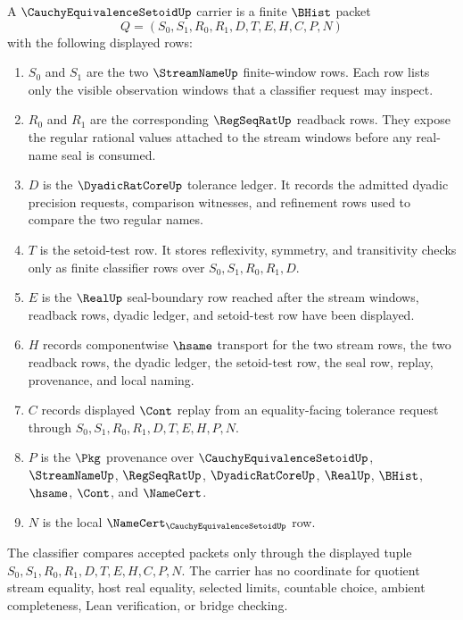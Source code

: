 \begin{definition}
\label{def:cauchy-equivalence-setoid-carrier}
A $\CauchyEquivalenceSetoidUp$ carrier is a finite $\BHist$ packet
$$
Q=(S_0,S_1,R_0,R_1,D,T,E,H,C,P,N)
$$
with the following displayed rows:
\begin{enumerate}
\item $S_0$ and $S_1$ are the two $\StreamNameUp$ finite-window rows. Each row lists only the visible observation windows that a classifier request may inspect.
\item $R_0$ and $R_1$ are the corresponding $\RegSeqRatUp$ readback rows. They expose the regular rational values attached to the stream windows before any real-name seal is consumed.
\item $D$ is the $\DyadicRatCoreUp$ tolerance ledger. It records the admitted dyadic precision requests, comparison witnesses, and refinement rows used to compare the two regular names.
\item $T$ is the setoid-test row. It stores reflexivity, symmetry, and transitivity checks only as finite classifier rows over $S_0,S_1,R_0,R_1,D$.
\item $E$ is the $\RealUp$ seal-boundary row reached after the stream windows, readback rows, dyadic ledger, and setoid-test row have been displayed.
\item $H$ records componentwise $\hsame$ transport for the two stream rows, the two readback rows, the dyadic ledger, the setoid-test row, the seal row, replay, provenance, and local naming.
\item $C$ records displayed $\Cont$ replay from an equality-facing tolerance request through $S_0,S_1,R_0,R_1,D,T,E,H,P,N$.
\item $P$ is the $\Pkg$ provenance over $\CauchyEquivalenceSetoidUp$, $\StreamNameUp$, $\RegSeqRatUp$, $\DyadicRatCoreUp$, $\RealUp$, $\BHist$, $\hsame$, $\Cont$, and $\NameCert$.
\item $N$ is the local $\NameCert_{\CauchyEquivalenceSetoidUp}$ row.
\end{enumerate}
The classifier compares accepted packets only through the displayed tuple $S_0,S_1,R_0,R_1,D,T,E,H,C,P,N$. The carrier has no coordinate for quotient stream equality, host real equality, selected limits, countable choice, ambient completeness, Lean verification, or bridge checking.
\end{definition}

